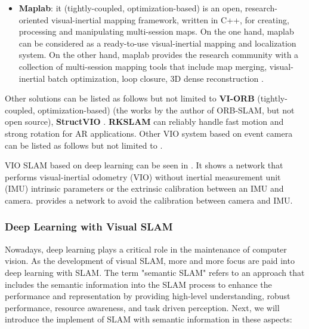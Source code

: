 \documentclass[journal,transmag]{IEEEtran}
\begin{document}
\begin{itemize}
    \item \textbf{Maplab}: it (tightly-coupled, optimization-based) is an open, research-oriented visual-inertial mapping framework, written in C++, for creating, processing and manipulating multi-session maps. On the one hand, maplab can be considered as a ready-to-use visual-inertial mapping and localization system. On the other hand, maplab provides the research community with a collection of multi-session mapping tools that include map merging, visual-inertial batch optimization, loop closure, 3D dense reconstruction \cite{schneider2018maplab}.
\end{itemize}

Other solutions can be listed as follows but not limited to \textbf{VI-ORB} (tightly-coupled, optimization-based) \cite{mur2017visual} (the works by the author of ORB-SLAM, but not open source), \textbf{StructVIO} \cite{zou2019structvio}. \textbf{RKSLAM} \cite{liu2016robust} can reliably handle fast motion and strong rotation for AR applications. Other VIO system based on event camera can be listed as follows but not limited to \cite{mueggler2018continuous}\cite{zhu2017event}\cite{nelson2019event}.

VIO SLAM based on deep learning can be seen in \cite{shamwell2019unsupervised}. It shows a network that performs visual-inertial odometry (VIO) without inertial measurement unit (IMU) intrinsic parameters or the extrinsic calibration between an IMU and camera. \cite{lee2019visual} provides a network to avoid the calibration between camera and IMU. 

\subsubsection{Deep Learning with Visual SLAM}
Nowadays, deep learning plays a critical role in the maintenance of computer vision. As the development of visual SLAM, more and more focus are paid into deep learning with SLAM. The term "semantic SLAM" refers to an approach that includes the semantic information into the SLAM process to enhance the performance and representation by providing high-level understanding, robust performance, resource awareness, and task driven perception. Next, we will introduce the implement of SLAM with semantic information in these aspects: 
\end{document}
